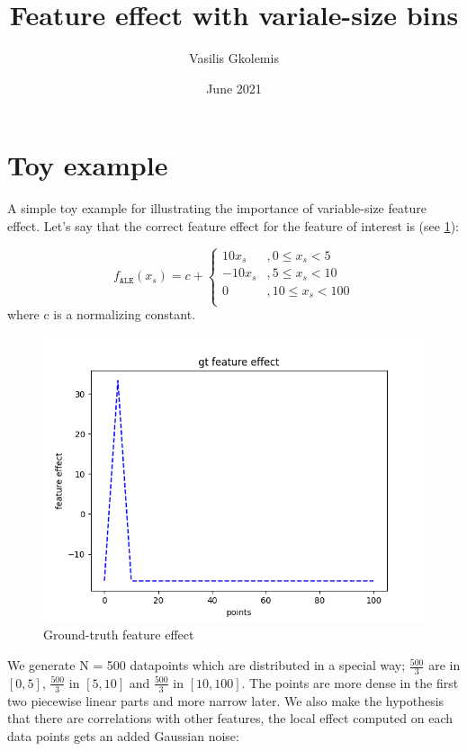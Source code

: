 \documentclass{article}
\title{Feature effect with variale-size bins}
\author{Vasilis Gkolemis}
\date{June 2021}
\begin{document}
\maketitle

\section{Toy example}

A simple toy example for illustrating the importance of variable-size feature effect. Let's say that the correct feature effect for the feature of interest is (see \ref{im:1}):

\begin{equation} \label{eq:feature-effect}
  f_{\mathtt{ALE}}(x_s) = c +
  \begin{cases}
    10x_s &,  0 \leq x_s < 5 \\
    -10x_s &, 5 \leq x_s < 10 \\
    0 &, 10 \leq x_s < 100 \\
  \end{cases}
\end{equation}
%
where c is a normalizing constant.

\begin{figure}[!h]\label{im:1}
  \centering
  \includegraphics[width=.7\linewidth]{Figure_1.png}
  \caption{Ground-truth feature effect}
\end{figure}


We generate N = 500 datapoints which are distributed in a special way;
\(\frac{500}{3}\) are in \([0,5]\), \(\frac{500}{3}\) in \([5,10]\)
and \(\frac{500}{3}\) in \([10,100]\). The points are more dense in
the first two piecewise linear parts and more narrow later. We also
make the hypothesis that there are correlations with other features,
the local effect computed on each data points gets an added Gaussian
noise:
\end{document}
